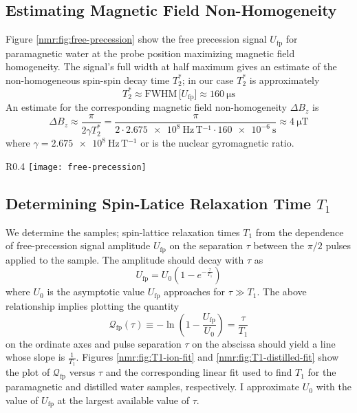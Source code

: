 \documentclass[11pt, a4paper]{article}
\begin{document}
\subsection{Estimating Magnetic Field Non-Homogeneity}
Figure \ref{nmr:fig:free-precession} show the free precession signal $ U_{\text{fp}} $ for paramagnetic water at the probe position maximizing magnetic field homogeneity. The signal's full width at half maximum gives an estimate of the non-homogeneous spin-spin decay time $ T_{2}^{*} $; in our case $ T_{2}^{*} $ is approximately
\begin{equation*}
	T_{2}^{*} \approx \text{FWHM}\, \big[U_{\text{fp}}\big] \approx \SI{160}{\micro \second}
\end{equation*}
An estimate for the corresponding magnetic field non-homogeneity $ \Delta B_{z} $ is
\begin{equation*}
	\Delta B_{z} \approx \frac{\pi}{2\gamma T_{2}^{*}} = \frac{\pi}{2\cdot \SI{2.675e8}{\hertz\, \tesla^{-1}}\cdot \SI{160e-6}{\second}} \approx \SI{4}{\micro \tesla}
\end{equation*}
where $ \gamma = \SI{2.675e8}{\hertz\, \tesla^{-1}} $ or is the nuclear gyromagnetic ratio.

\begin{wrapfigure}{R}{0.4\textwidth}
\centering
\texttt{[image: free-precession]}

\caption{Free precession signal.}
\label{nmr:fig:free-precession}
\end{wrapfigure}


\subsection{Determining Spin-Latice Relaxation Time $ T_{1} $}
We determine the samples; spin-lattice relaxation times $ T_{1} $ from the dependence of free-precession signal amplitude $ U_{\text{fp}} $ on the separation $ \tau $ between the $ \pi/2 $ pulses applied to the sample. The amplitude should decay with $ \tau $ as
\begin{equation*}
	U_{\text{fp}} = U_{0}\left(1 - e^{-\frac{\tau}{T_{1}}}\right) 
\end{equation*}
where $ U_{0} $ is the asymptotic value $ U_{\text{fp}} $ approaches for $ \tau \gg T_{1} $. The above relationship implies plotting the quantity
\begin{equation*}
	\mathcal{Q}_{\text{fp}}(\tau) \equiv -\ln\left(1 - \frac{U_{\text{fp}}}{U_{0}}\right) = \frac{\tau}{T_{1}}
\end{equation*}
on the ordinate axes and pulse separation $ \tau $ on the abscissa should yield a line whose slope is $ \frac{1}{T_{1}} $. Figures \ref{nmr:fig:T1-ion-fit} and \ref{nmr:fig:T1-distilled-fit} show the plot of $ \mathcal{Q}_{\text{fp}} $ versus $ \tau $ and the corresponding linear fit used to find $ T_{1} $ for the paramagnetic and distilled water samples, respectively. I approximate $ U_{0} $ with the value of $ U_{\text{fp}} $ at the largest available value of $ \tau $.
\end{document}
